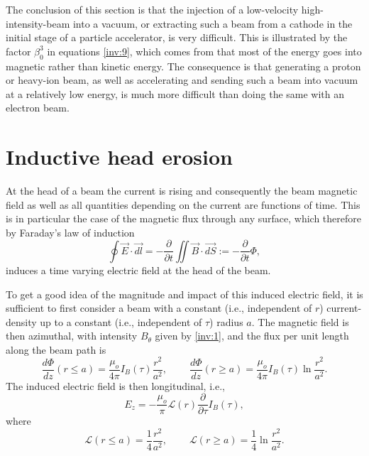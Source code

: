 \documentclass [12pt,a4paper,     ]{report} %
\newcommand{\DEF}{:=}                 %
\begin{document}
  The conclusion of this section is that the injection of a low-velocity  high-intensity-beam into a vacuum, or extracting such a beam from a cathode in the initial stage of a particle accelerator, is very difficult.  This is illustrated by the factor $\beta_0^3$ in equations \eqref{inv:9}, which comes from that most of the energy goes into magnetic rather than kinetic energy.  The consequence is that generating a proton or heavy-ion beam, as well as accelerating and sending such a beam into vacuum at a relatively low energy, is much more difficult than doing the same with an electron beam.



\section{Inductive head erosion}
\label{ind:0}

At the head of a beam the current is rising and consequently the beam magnetic field as well as all quantities depending on the current are functions of time. This is in particular the case of the magnetic flux through any surface, which therefore by Faraday's law of induction
%
\begin{equation}\label{ind:1} %
       \oint \vec{E}\cdot\vec{dl}
        = - \frac{\partial}{\partial t}\iint \vec{B}\cdot\vec{dS}
        \DEF - \frac{\partial}{\partial t} \Phi,
\end{equation} 
%
induces a time varying electric field at the head of the beam.

  To get a good idea of the magnitude and impact of this induced electric field, it is sufficient to first consider a beam with a constant (i.e., independent of  $r$) current-density up to a constant (i.e., independent of $\tau$) radius $a$.  The magnetic field is then azimuthal, with intensity $B_\theta$ given by \eqref{inv:1}, and the flux per unit length along the beam path is 
%
\begin{equation}\label{ind:2} %
       \frac{d \Phi}{d z} (r \leq a)
     = \frac{\mu_o}{4\pi} I_B(\tau) \frac{r^2}{a^2}, ~~~ ~~  ~~ ~~~
       \frac{d \Phi}{d z} (r \geq a)
     = \frac{\mu_o}{4\pi} I_B(\tau) \ln \frac{r^2}{a^2}.
\end{equation}
%
The induced electric field is then longitudinal, i.e.,
%
\begin{equation}\label{ind:3} %
       E_z = - \frac{\mu_o}{\pi} \mathcal{L}(r)
               \frac{\partial}{\partial \tau} I_B(\tau),
\end{equation} 
%
where
%
\begin{equation}\label{ind:4} %
       \mathcal{L} (r \leq a)
     = \frac{1}{4} \frac{r^2}{a^2}, ~~~ ~~  ~~ ~~~
       \mathcal{L} (r \geq a)
     = \frac{1}{4} \ln \frac{r^2}{a^2}.
\end{equation}
%
\end{document}
